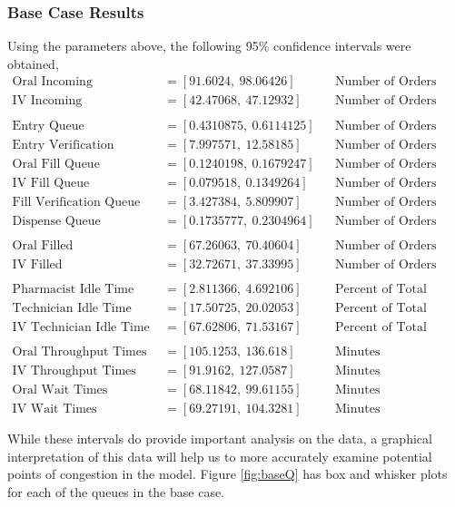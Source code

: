 \documentclass[10pt]{report}            %
\begin{document}
\subsubsection*{Base Case Results}
Using the parameters above, the following 95\% confidence intervals were obtained,
\begin{align*}
\text{Oral Incoming} &= [91.6024,\ 98.06426] && \text{Number of Orders}\\
\text{IV Incoming} &= [42.47068,\ 47.12932] && \text{Number of Orders}\\\\
\text{Entry Queue} &= [0.4310875,\ 0.6114125] && \text{Number of Orders}\\
\text{Entry Verification Queue} &= [7.997571,\ 12.58185] && \text{Number of Orders}\\
\text{Oral Fill Queue} &= [0.1240198,\ 0.1679247] && \text{Number of Orders}\\
\text{IV Fill Queue} &= [0.079518,\ 0.1349264] && \text{Number of Orders}\\
\text{Fill Verification Queue} &= [3.427384,\ 5.809907] && \text{Number of Orders}\\
\text{Dispense Queue} &= [0.1735777,\ 0.2304964] && \text{Number of Orders}\\\\
\text{Oral Filled} &= [67.26063,\ 70.40604] && \text{Number of Orders}\\
\text{IV Filled} &= [32.72671,\ 37.33995] && \text{Number of Orders}\\\\
\text{Pharmacist Idle Time} &= [2.811366,\ 4.692106] && \text{Percent of Total Time}\\
\text{Technician Idle Time} &= [17.50725,\ 20.02053] && \text{Percent of Total Time}\\
\text{IV Technician Idle Time} &= [67.62806,\ 71.53167] && \text{Percent of Total Time}\\\\
\text{Oral Throughput Times} &= [105.1253,\ 136.618] && \text{Minutes}\\
\text{IV Throughput Times} &= [91.9162,\ 127.0587] && \text{Minutes}\\
\text{Oral Wait Times} &= [68.11842,\ 99.61155] && \text{Minutes}\\
\text{IV Wait Times} &= [69.27191,\ 104.3281] && \text{Minutes}\\\\
\end{align*}
While these intervals do provide important analysis on the data, a graphical interpretation of this data will help us to more accurately examine potential points of congestion in the model. Figure \ref{fig:baseQ} has box and whisker plots for each of the queues in the base case.
\end{document}
